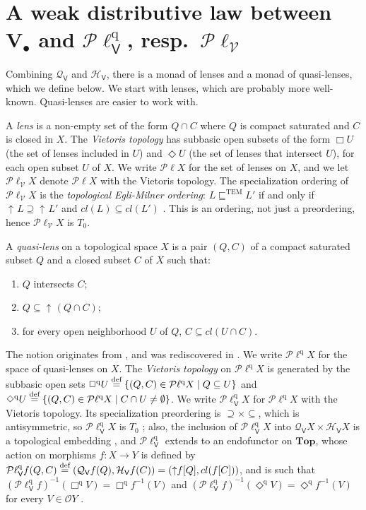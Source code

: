 \documentclass[preprint,12pt]{elsarticle}
\newcommand\eqdef{\mathrel{\buildrel \text{def}\over=}}
\DeclareMathOperator{\upc}{\uparrow\!}
\newcommand\Smyth{{\mathcal Q}}
\newcommand\Hoare{{\mathcal H}}
\newcommand\Vt{\mathsf{V}}
\newcommand\HV{\Hoare_\Vt}
\newcommand\SV{\Smyth_{\Vt}}
\newcommand\quasi{\mathrm{q}} %
\newcommand\QL{\Plotkin^\quasi}
\newcommand\QLV{\QL_\Vt}
\newcommand\Plotkin{\mathcal P\ell} %
\newcommand\TEMleq{\sqsubseteq^{\text{TEM}}}
\newcommand\Plotkinn{\Plotkin_{\mathcal V}}
\newcommand\Val{{\mathbf V}}
\newcommand\Open{{\mathcal O}}
\newcommand\Topcat{\mathbf{Top}}
\begin{document}
\part{A weak distributive law between $\Val_\bullet$ and $\QLV$,
  resp.\ $\Plotkinn$}

Combining $\SV$ and $\HV$, there is a monad of lenses and a monad of
quasi-lenses, which we define below.  We start with lenses, which are
probably more well-known.  Quasi-lenses are easier to work with.

A \emph{lens} is a non-empty set of the form $Q \cap C$ where $Q$ is
compact saturated and $C$ is closed in $X$.  The \emph{Vietoris
  topology} has subbasic open subsets of the form $\Box U$ (the set of
lenses included in $U$) and $\Diamond U$ (the set of lenses that
intersect $U$), for each open subset $U$ of $X$.  We write
$\Plotkin X$ for the set of lenses on $X$, and we let $\Plotkinn X$
denote $\Plotkin X$ with the Vietoris topology.  The specialization
ordering of $\Plotkinn X$ is the \emph{topological Egli-Milner
  ordering}: $L \TEMleq L'$ if and only if $\upc L \supseteq \upc L'$
and $cl (L) \subseteq cl (L')$ \cite[Discussion before
Fact~4.1]{GL:duality}.  This is an ordering, not just a preordering,
hence $\Plotkinn X$ is $T_0$.

A \emph{quasi-lens} on a topological space $X$ is a pair $(Q, C)$ of a
compact saturated subset $Q$ and a closed subset $C$ of $X$ such that:
\begin{enumerate}
\item $Q$ intersects $C$;
\item $Q \subseteq \upc (Q \cap C)$;
\item for every open neighborhood $U$ of $Q$, $C \subseteq cl (U
  \cap C)$.
\end{enumerate}
The notion originates from \cite[Theorem~9.6]{heckmann:2ndorder}, and
was rediscovered in \cite[Section~5]{GL:duality}.  We write $\QL X$
for the space of quasi-lenses on $X$.  The \emph{Vietoris topology} on
$\QL X$ is generated by the subbasic open sets
$\Box^\quasi U \eqdef \{(Q, C) \in \QL X \mid Q \subseteq U\}$ and
$\Diamond^\quasi U \eqdef \{(Q, C) \in \QL X \mid C \cap U \neq
\emptyset\}$.  We write $\QLV X$ for $\QL X$ with the Vietoris
topology.  Its specialization preordering is
$\supseteq \times \subseteq$, which is antisymmetric, so $\QLV X$ is
$T_0$ \cite[Lemma~8.2, item~2]{JGL:projlim:prev}; also, the inclusion
of $\QLV X$ into $\SV X \times \HV X$ is a topological embedding
\cite[Lemma~8.2, item~1]{JGL:projlim:prev}, and $\QLV$ extends to an
endofunctor on $\Topcat$, whose action on morphisms $f \colon X \to Y$
is defined by
$\QLV f (Q, C) \eqdef (\SV f (Q), \HV f (C)) = (\upc f [Q], cl (f
[C]))$, and is such that
${(\QLV f)}^{-1} (\Box^\quasi V) = \Box^\quasi {f^{-1} (V)}$ and
${(\QLV f)}^{-1} (\Diamond^\quasi V) = \Diamond^\quasi {f^{-1} (V)}$
for every $V \in \Open Y$ \cite[Lemma~8.3]{JGL:projlim:prev}.
\end{document}
